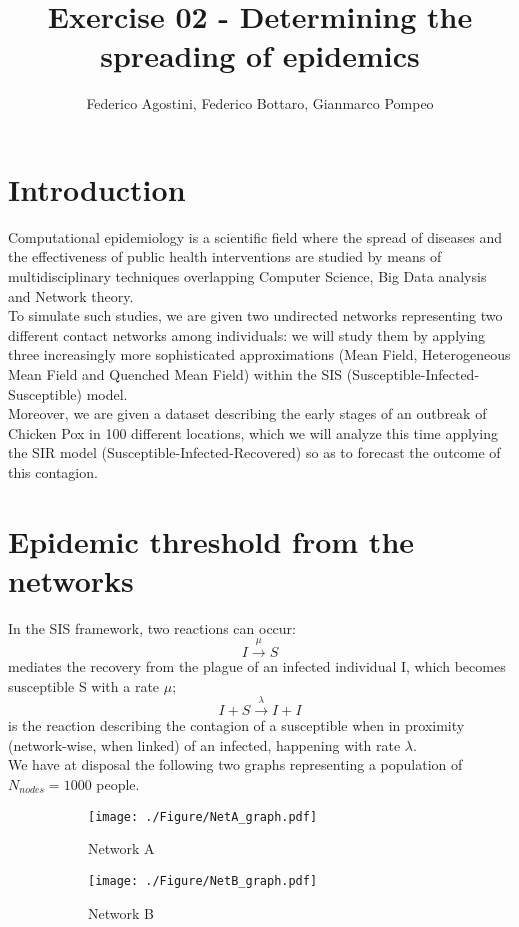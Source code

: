\documentclass[a4paper,11pt]{article}
\title{Exercise 02 - Determining the spreading of epidemics}
\author{Federico Agostini, Federico Bottaro, Gianmarco Pompeo}
\date{}
\begin{document}
\maketitle

\section{Introduction}
Computational epidemiology is a scientific field where the spread of diseases and the effectiveness of public health interventions are studied by means of multidisciplinary techniques overlapping Computer Science, Big Data analysis and Network theory.
\\
To simulate such studies, we are given two undirected networks representing two different contact networks among individuals: we will study them by applying three increasingly more sophisticated approximations (Mean Field, Heterogeneous Mean Field and Quenched Mean Field) within the SIS (Susceptible-Infected-Susceptible) model.
\\
Moreover, we are given a dataset describing the early stages of an outbreak of Chicken Pox in 100 different locations, which we will analyze this time applying the SIR model (Susceptible-Infected-Recovered) so as to forecast the outcome of this contagion.



\section{Epidemic threshold from the networks}
In the SIS framework, two reactions can occur: 
    \begin{equation}
        I \overset{\mu}{\longrightarrow} S
    \end{equation}
mediates the recovery from the plague of an infected individual I, which becomes susceptible S with a rate $\mu$;
    \begin{equation}
    I + S \overset{\lambda}{\longrightarrow} I + I
    \end{equation}
is the reaction describing the contagion of a susceptible when in proximity (network-wise, when linked) of an infected, happening with rate $\lambda$.
\\
We have at disposal the following two graphs representing a population of $N_{nodes}=1000$ people.

\begin{figure}[htp]
  \centering
  \begin{subfigure}{.49\textwidth}
    \texttt{[image: ./Figure/NetA\_graph.pdf]}  
  \caption{Network A}
  \label{fig:netA}
  \end{subfigure}
  \begin{subfigure}{.49\textwidth}
  \texttt{[image: ./Figure/NetB\_graph.pdf]}  
  \caption{Network B}
  \label{fig:netB}
  \end{subfigure}
  \caption{}
  \label{fig:net}
\end{figure}
\end{document}
